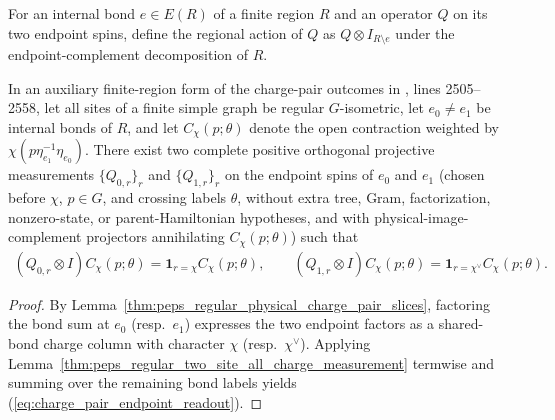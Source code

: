 \begin{definition}
    \label{def:peps_regular_charge_pair_endpoint_action}
    For an internal bond $e\in E(R)$ of a finite region $R$ and an operator $Q$ on its two endpoint spins, define the regional action of $Q$ as $Q\otimes I_{R\setminus e}$ under the endpoint-complement decomposition of $R$.
    \leanok
\end{definition}

\begin{lemma}
    \label{thm:peps_regular_charge_pair_endpoint_readout}
    In an auxiliary finite-region form of the charge-pair outcomes in \cite{Schuch2010PEPS}, lines 2505--2558, let all sites of a finite simple graph be regular $G$-isometric, let $e_0\ne e_1$ be internal bonds of $R$, and let $C_\chi(p;\theta)$ denote the open contraction weighted by $\chi(p\eta_{e_1}^{-1}\eta_{e_0})$.
    There exist two complete positive orthogonal projective measurements $\{Q_{0,r}\}_r$ and $\{Q_{1,r}\}_r$ on the endpoint spins of $e_0$ and $e_1$ (chosen before $\chi$, $p\in G$, and crossing labels $\theta$, without extra tree, Gram, factorization, nonzero-state, or parent-Hamiltonian hypotheses, and with physical-image-complement projectors annihilating $C_\chi(p;\theta)$) such that
    \begin{align}
        (Q_{0,r}\otimes I)C_\chi(p;\theta)
        =\mathbf1_{r=\chi}C_\chi(p;\theta),\qquad
        (Q_{1,r}\otimes I)C_\chi(p;\theta)
        =\mathbf1_{r=\chi^\vee}C_\chi(p;\theta). \label{eq:charge_pair_endpoint_readout}
    \end{align}
    \leanok
\end{lemma}
\begin{proof}\leanok
    By Lemma~\ref{thm:peps_regular_physical_charge_pair_slices}, factoring the bond sum at $e_0$ (resp.\ $e_1$) expresses the two endpoint factors as a shared-bond charge column with character $\chi$ (resp.\ $\chi^\vee$).
    Applying Lemma~\ref{thm:peps_regular_two_site_all_charge_measurement} termwise and summing over the remaining bond labels yields (\ref{eq:charge_pair_endpoint_readout}).
\end{proof}

